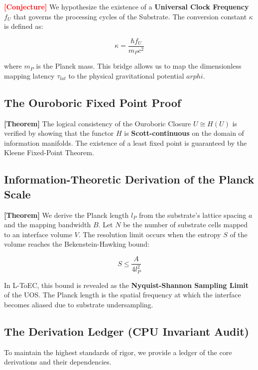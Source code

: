 \documentclass[11pt,titlepage]{article}
\newcommand{\tagtheo}{\textcolor{green!60!black}{\textbf{[Theorem]}} }
\newcommand{\tagconj}{\textcolor{red}{\textbf{[Conjecture]}} }
\begin{document}
\tagconj We hypothesize the existence of a \textbf{Universal Clock Frequency} $f_U$ that governs the processing cycles of the Substrate. The conversion constant $\kappa$ is defined as:

\begin{equation}
\kappa = \frac{\hbar f_U}{m_P c^2}
\end{equation}

where $m_P$ is the Planck mass. This bridge allows us to map the dimensionless mapping latency $\tau_{lat}$ to the physical gravitational potential $arphi$.

\subsection{The Ouroboric Fixed Point Proof}
\tagtheo The logical consistency of the Ouroboric Closure $U \cong H(U)$ is verified by showing that the functor $H$ is \textbf{Scott-continuous} on the domain of information manifolds. The existence of a least fixed point is guaranteed by the Kleene Fixed-Point Theorem.

\subsection{Information-Theoretic Derivation of the Planck Scale}
\tagtheo We derive the Planck length $l_P$ from the substrate's lattice spacing $a$ and the mapping bandwidth $B$. Let $N$ be the number of substrate cells mapped to an interface volume $V$. The resolution limit occurs when the entropy $S$ of the volume reaches the Bekenstein-Hawking bound:

\begin{equation}
S \le \frac{A}{4l_P^2}
\end{equation}

In L-ToEC, this bound is revealed as the \textbf{Nyquist-Shannon Sampling Limit} of the UOS. The Planck length is the spatial frequency at which the interface becomes aliased due to substrate undersampling.

\subsection{The Derivation Ledger (CPU Invariant Audit)}
To maintain the highest standards of rigor, we provide a ledger of the core derivations and their dependencies.
\end{document}
